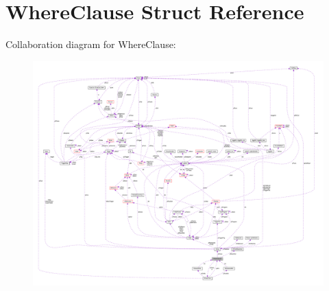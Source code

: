 \hypertarget{struct_where_clause}{\section{Where\-Clause Struct Reference}
\label{struct_where_clause}
}


Collaboration diagram for Where\-Clause\-:\nopagebreak
\begin{figure}[H]
\begin{center}
\leavevmode
\includegraphics[width=350pt]{struct_where_clause__coll__graph}
\end{center}
\end{figure}

